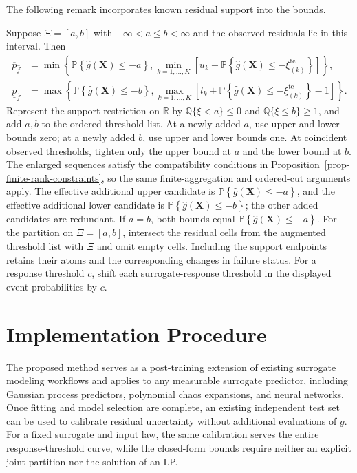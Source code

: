 \documentclass[review,11pt,3p,authoryear,nopreprintline]{elsarticle}
\begin{document}
The following remark incorporates known residual support into the bounds.

\begin{remark}
  \label{rem-interval-support}
  Suppose $\Xi=[a,b]$ with $-\infty<a\le b<\infty$ and the observed residuals lie in this interval. Then
  \begin{align*}
    \overline p_{\hat f}
      &=\min\left\{\mathbb P\left\{\hat g(\bm X)\le-a\right\},
        \min_{k=1,\ldots,K}\left[u_k+\mathbb P\left\{\hat g(\bm X)\le-\xi_{(k)}^{\mathrm{te}}\right\}\right]\right\},\\
    \underline p_{\hat f}
      &=\max\left\{\mathbb P\left\{\hat g(\bm X)\le-b\right\},
        \max_{k=1,\ldots,K}\left[l_k+\mathbb P\left\{\hat g(\bm X)\le-\xi_{(k)}^{\mathrm{te}}\right\}-1\right]\right\}.
  \end{align*}
  Represent the support restriction on $\mathbb R$ by $\mathbb Q\{\xi<a\}\le0$ and $\mathbb Q\{\xi\le b\}\ge1$, and add $a,b$ to the ordered threshold list. At a newly added $a$, use upper and lower bounds zero; at a newly added $b$, use upper and lower bounds one. At coincident observed thresholds, tighten only the upper bound at $a$ and the lower bound at $b$. The enlarged sequences satisfy the compatibility conditions in Proposition~\ref{prop-finite-rank-constraints}, so the same finite-aggregation and ordered-cut arguments apply. The effective additional upper candidate is $\mathbb P\left\{\hat g(\bm X)\le-a\right\}$, and the effective additional lower candidate is $\mathbb P\left\{\hat g(\bm X)\le-b\right\}$; the other added candidates are redundant. If $a=b$, both bounds equal $\mathbb P\left\{\hat g(\bm X)\le-a\right\}$. For the partition on $\Xi=[a,b]$, intersect the residual cells from the augmented threshold list with $\Xi$ and omit empty cells. Including the support endpoints retains their atoms and the corresponding changes in failure status. For a response threshold $c$, shift each surrogate-response threshold in the displayed event probabilities by $c$.
\end{remark}

\section{Implementation Procedure}
\label{sec-implementation}

The proposed method serves as a post-training extension of existing surrogate modeling workflows and applies to any measurable surrogate predictor, including Gaussian process predictors, polynomial chaos expansions, and neural networks. Once fitting and model selection are complete, an existing independent test set can be used to calibrate residual uncertainty without additional evaluations of $g$. For a fixed surrogate and input law, the same calibration serves the entire response-threshold curve, while the closed-form bounds require neither an explicit joint partition nor the solution of an LP.
\end{document}
